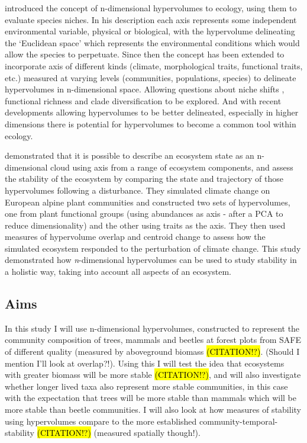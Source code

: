 \cite{Hutchinson1957} introduced the concept of n-dimensional hypervolumes to ecology, using them to evaluate species niches. In his description each axis represents some independent environmental variable, physical or biological, with the hypervolume delineating the ‘Euclidean space’ which represents the environmental conditions which would allow the species to perpetuate. Since then the concept has been extended to incorporate axis of different kinds (climate, morphological traits, functional traits, etc.) measured at varying levels (communities, populations, species) to delineate hypervolumes in n-dimensional space. Allowing questions about niche shifts \citep{Tingley2014, Blonder2015, Jackson2000, Evans2009}, functional richness \citep{Lamanna2014} and clade diversification \citep{Sidlauskas2008} to be explored. And with recent developments allowing hypervolumes to be better delineated, especially in higher dimensions \citep{Blonder2014, Blonder2017b, Junker2016} there is potential for hypervolumes to become a common tool within ecology.

 
\cite{Barros2016} demonstrated that it is possible to describe an ecosystem state as an n-dimensional cloud using axis from a range of ecosystem components, and assess the stability of the ecosystem by comparing the state and trajectory of those hypervolumes following a disturbance. They simulated climate change on European alpine plant communities and constructed two sets of hypervolumes, one from plant functional groups (using abundances as axis - after a PCA to reduce dimensionality) and the other using traits as the axis. They then used measures of hypervolume overlap and centroid change to assess how the simulated ecosystem responded to the perturbation of climate change. This study demonstrated how \emph{n}-dimensional hypervolumes can be used to study stability in a holistic way, taking into account all aspects of an ecosystem.


\subsection{Aims}

In this study I will use n-dimensional hypervolumes, constructed to represent the community composition of trees, mammals and beetles at forest plots from SAFE of different quality (measured by aboveground biomass \hl{(CITATION!?)}. (Should I mention I'll look at overlap?!). Using this I will test the idea that ecosystems with greater biomass will be more stable \hl{(CITATION!?)}, and will also investigate whether longer lived taxa also represent more stable communities, in this case with the expectation that trees will be more stable than mammals which will be more stable than beetle communities. I will also look at how measures of stability using hypervolumes compare to the more established community-temporal-stability \hl{(CITATION!?)} (measured spatially though!).

